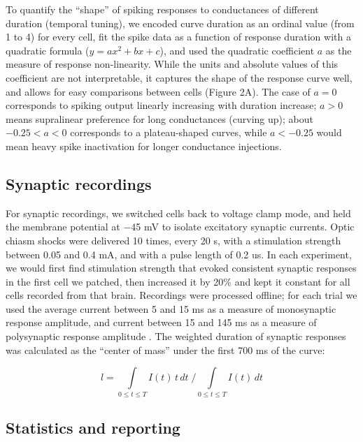 \documentclass{article}
\begin{document}
To quantify the “shape” of spiking responses to conductances of different duration (temporal tuning), we encoded curve duration as an ordinal value (from 1 to 4) for every cell, fit the spike data as a function of response duration with a quadratic formula ($y = ax^2 + bx +c$), and used the quadratic coefficient $a$ as the measure of response non-linearity. While the units and absolute values of this coefficient are not interpretable, it captures the shape of the response curve well, and allows for easy comparisons between cells (Figure 2A). The case of $a=0$ corresponds to spiking output linearly increasing with duration increase; $a>0$ means supralinear preference for long conductances (curving up); about $-0.25<a<0$ corresponds to a plateau-shaped curves, while $a<-0.25$ would mean heavy spike inactivation for longer conductance injections. 

\subsection*{Synaptic recordings}

For synaptic recordings, we switched cells back to voltage clamp mode, and held the membrane potential at $-$45 mV to isolate excitatory synaptic currents. Optic chiasm shocks were delivered 10 times, every 20 s, with a stimulation strength between 0.05 and 0.4 mA, and with a pulse length of 0.2 us. In each experiment, we would first find stimulation strength that evoked consistent synaptic responses in the first cell we patched, then increased it by 20\% and kept it constant for all cells recorded from that brain. Recordings were processed offline; for each trial we used the average current between 5 and 15 ms as a measure of monosynaptic response amplitude, and current between 15 and 145 ms as a measure of polysynaptic response amplitude \citep{ciarleglio2015}. The weighted duration of synaptic responses was calculated as the “center of mass” under the first 700 ms of the curve:

$$\displaystyle l=\int\limits_{0 \leq t \leq T}{I(t)\, t \, dt} \; \Big/ \int\limits_{0 \leq t \leq T}{I(t) \, dt}$$

\subsection*{Statistics and reporting}
\end{document}
